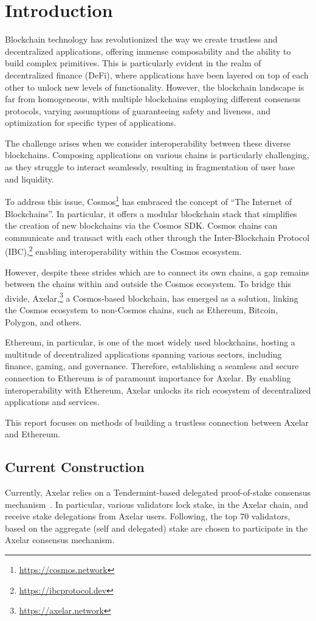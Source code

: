 \section{Introduction}
Blockchain technology has revolutionized the way we create trustless and decentralized applications, offering immense composability and the ability to build complex primitives. This is particularly evident in the realm of decentralized finance (DeFi), where applications have been layered on top of each other to unlock new levels of functionality. However, the blockchain landscape is far from homogeneous, with multiple blockchains employing different consensus protocols, varying assumptions of guaranteeing safety and liveness, and optimization for specific types of applications.

The challenge arises when we consider interoperability between these diverse blockchains. Composing applications on various chains is particularly challenging, as they struggle to interact seamlessly, resulting in fragmentation of user base and liquidity.

To address this issue, Cosmos\footnote{\url{https://cosmos.network}} has embraced the concept of ``The Internet of Blockchains''. In particular, it offers a modular blockchain stack that simplifies the creation of new blockchains via the Cosmos SDK. Cosmos chains can communicate and transact with each other through the Inter-Blockchain Protocol (IBC),\footnote{\url{https://ibcprotocol.dev}} enabling interoperability within the Cosmos ecosystem.

However, despite these strides which are to connect its own chains, a gap remains between the chains within and outside the Cosmos ecosystem. To bridge this divide, Axelar,\footnote{\url{https://axelar.network}} a Cosmos-based blockchain, has emerged as a solution, linking the Cosmos ecosystem to non-Cosmos chains, such as Ethereum, Bitcoin, Polygon, and others.

Ethereum, in particular, is one of the most widely used blockchains, hosting a multitude of decentralized applications spanning various sectors, including finance, gaming, and governance. Therefore, establishing a seamless and secure connection to Ethereum is of paramount importance for Axelar. By enabling interoperability with Ethereum, Axelar unlocks its rich ecosystem of decentralized applications and services.

This report focuses on methods of building a trustless connection between Axelar and Ethereum.

\subsection{Current Construction}
Currently, Axelar relies on a Tendermint-based delegated proof-of-stake consensus mechanism~\cite{axelar-whitepaper}. In particular, various validators lock stake, in the Axelar chain, and receive stake delegations from Axelar users. Following, the top $70$ validators, based on the aggregate (self and delegated) stake are chosen to participate in the Axelar consensus mechanism.

